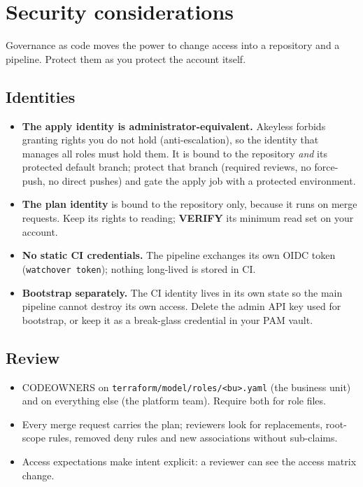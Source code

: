 \chapter{Security considerations}\label{ch:security}

Governance as code moves the power to change access into a repository and a pipeline. Protect
them as you protect the account itself.

\section{Identities}
\begin{itemize}
\item \textbf{The apply identity is administrator-equivalent.} Akeyless forbids granting rights you
  do not hold (anti-escalation), so the identity that manages all roles must hold them. It is
  bound to the repository \emph{and} its protected default branch; protect that branch (required
  reviews, no force-push, no direct pushes) and gate the apply job with a protected environment.
\item \textbf{The plan identity} is bound to the repository only, because it runs on merge
  requests. Keep its rights to reading; \textbf{VERIFY} its minimum read set on your account.
\item \textbf{No static CI credentials.} The pipeline exchanges its own OIDC token
  (\texttt{watchover token}); nothing long-lived is stored in CI.
\item \textbf{Bootstrap separately.} The CI identity lives in its own state so the main pipeline
  cannot destroy its own access. Delete the admin API key used for bootstrap, or keep it as a
  break-glass credential in your PAM vault.
\end{itemize}

\section{Review}
\begin{itemize}
\item CODEOWNERS on \texttt{terraform/model/roles/<bu>.yaml} (the business unit) and on everything
  else (the platform team). Require both for role files.
\item Every merge request carries the plan; reviewers look for replacements, root-scope rules,
  removed deny rules and new associations without sub-claims.
\item Access expectations make intent explicit: a reviewer can see the access matrix change.
\end{itemize}

